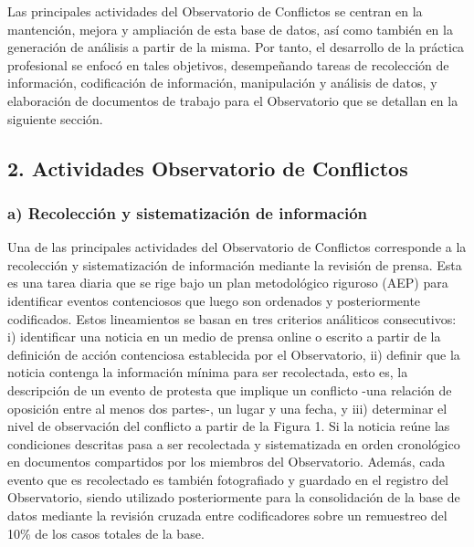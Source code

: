 \documentclass[
  12pt,
]{article}
\begin{document}
Las principales actividades del Observatorio de Conflictos se centran en
la mantención, mejora y ampliación de esta base de datos, así como
también en la generación de análisis a partir de la misma. Por tanto, el
desarrollo de la práctica profesional se enfocó en tales objetivos,
desempeñando tareas de recolección de información, codificación de
información, manipulación y análisis de datos, y elaboración de
documentos de trabajo para el Observatorio que se detallan en la
siguiente sección.

\hypertarget{actividades-observatorio-de-conflictos}{%
\subsection{2. Actividades Observatorio de
Conflictos}\label{actividades-observatorio-de-conflictos}}

\hypertarget{a-recolecciuxf3n-y-sistematizaciuxf3n-de-informaciuxf3n}{%
\subsubsection{a) Recolección y sistematización de
información}\label{a-recolecciuxf3n-y-sistematizaciuxf3n-de-informaciuxf3n}}

\doublespacing

Una de las principales actividades del Observatorio de Conflictos
corresponde a la recolección y sistematización de información mediante
la revisión de prensa. Esta es una tarea diaria que se rige bajo un plan
metodológico riguroso (AEP) para identificar eventos contenciosos que
luego son ordenados y posteriormente codificados. Estos lineamientos se
basan en tres criterios análiticos consecutivos: i) identificar una
noticia en un medio de prensa online o escrito a partir de la definición
de acción contenciosa establecida por el Observatorio, ii) definir que
la noticia contenga la información mínima para ser recolectada, esto es,
la descripción de un evento de protesta que implique un conflicto -una
relación de oposición entre al menos dos partes-, un lugar y una fecha,
y iii) determinar el nivel de observación del conflicto a partir de la
Figura 1. Si la noticia reúne las condiciones descritas pasa a ser
recolectada y sistematizada en orden cronológico en documentos
compartidos por los miembros del Observatorio. Además, cada evento que
es recolectado es también fotografiado y guardado en el registro del
Observatorio, siendo utilizado posteriormente para la consolidación de
la base de datos mediante la revisión cruzada entre codificadores sobre
un remuestreo del 10\% de los casos totales de la base.
\end{document}
